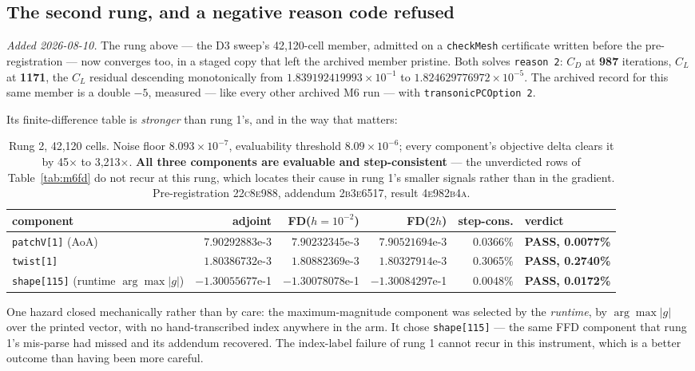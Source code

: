 \documentclass[11pt,a4paper]{article}
\newcommand{\commit}[1]{\textsc{\small #1}}
\begin{document}
\subsection{The second rung, and a negative reason code refused}
\label{sec:rung2}

\emph{Added 2026-08-10.} The rung above --- the D3 sweep's 42{,}120-cell member, admitted on a
\texttt{checkMesh} certificate written before the pre-registration --- now converges too, in a
staged copy that left the archived member pristine. Both solves \texttt{reason 2}: \(C_D\) at
\textbf{987} iterations, \(C_L\) at \textbf{1171}, the \(C_L\) residual descending monotonically
from \(1.839192419993\times10^{-1}\) to \(1.824629776972\times10^{-5}\). The archived record for
this same member is a double \(-5\), measured --- like every other archived M6 run --- with
\texttt{transonicPCOption 2}.

Its finite-difference table is \emph{stronger} than rung 1's, and in the way that matters:

\begin{table}[htbp]
\centering\scriptsize
\begin{tabular}{@{}L{3.2cm}rrrrl@{}}
\toprule
component & adjoint & FD(\(h=10^{-2}\)) & FD(\(2h\)) & step-cons. & verdict \\
\midrule
\texttt{patchV[1]} (AoA) & \(7.90292883\)e-3 & \(7.90232345\)e-3 & \(7.90521694\)e-3 & 0.0366\% & \textbf{PASS, 0.0077\%} \\
\texttt{twist[1]} & \(1.80386732\)e-3 & \(1.80882369\)e-3 & \(1.80327914\)e-3 & 0.3065\% & \textbf{PASS, 0.2740\%} \\
\texttt{shape[115]} (runtime \(\arg\max\lvert g\rvert\)) & \(-1.30055677\)e-1 & \(-1.30078078\)e-1 & \(-1.30084297\)e-1 & 0.0048\% & \textbf{PASS, 0.0172\%} \\
\bottomrule
\end{tabular}
\caption{Rung 2, 42{,}120 cells. Noise floor \(8.093\times10^{-7}\), evaluability threshold
\(8.09\times10^{-6}\); every component's objective delta clears it by 45\(\times\) to
3{,}213\(\times\). \textbf{All three components are evaluable and step-consistent} --- the
unverdicted rows of Table~\ref{tab:m6fd} do not recur at this rung, which locates their cause
in rung 1's smaller signals rather than in the gradient. Pre-registration
\commit{22c8e988}, addendum \commit{2b3e6517}, result \commit{4e982b4a}.}
\label{tab:m6fdr2}
\end{table}

One hazard closed mechanically rather than by care: the maximum-magnitude component was
selected by the \emph{runtime}, by \(\arg\max\lvert g\rvert\) over the printed vector, with no
hand-transcribed index anywhere in the arm. It chose \texttt{shape[115]} --- the same FFD
component that rung 1's mis-parse had missed and its addendum recovered. The index-label
failure of rung 1 cannot recur in this instrument, which is a better outcome than having been
more careful.
\end{document}
